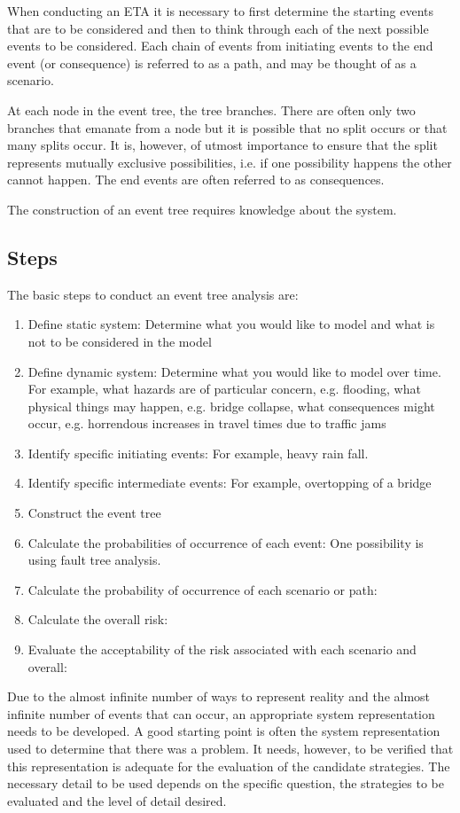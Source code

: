 When conducting an ETA it is necessary to first determine the starting events
that are to be considered and then to think through each of the next possible
events to be considered. Each chain of events from initiating events to the end
event (or consequence) is referred to as a path, and may be thought of as a
scenario.

At each node in the event tree, the tree branches. There are often only two
branches that emanate from a node but it is possible that no split occurs or that
many splits occur. It is, however, of utmost importance to ensure that the split
represents mutually exclusive possibilities, i.e. if one possibility happens the
other cannot happen. The end events are often referred to as consequences.

The construction of an event tree requires knowledge about the system.
\subsection{Steps}


The basic steps to conduct an event tree analysis are:
\begin{enumerate}
\item Define static system: Determine what you would like to model and what is not to
be considered in the model
\item Define dynamic system: Determine what you would like to model over time. For
example, what hazards are of particular concern, e.g. flooding, what physical
things may happen, e.g. bridge collapse, what consequences might occur, e.g.
horrendous increases in travel times due to traffic jams
\item Identify specific initiating events: For example, heavy rain fall.
\item Identify specific intermediate events: For example, overtopping of a bridge
\item Construct the event tree
\item Calculate the probabilities of occurrence of each event: One possibility is
using fault tree analysis.
\item Calculate the probability of occurrence of each scenario or path:
\item Calculate the overall risk:
\item Evaluate the acceptability of the risk associated with each scenario and
overall:
\end{enumerate}
%
Due to the almost infinite number of ways to represent reality and the almost
infinite number of events that can occur, an appropriate system representation
needs to be developed. A good starting point is often the system representation
used to determine that there was a problem. It needs, however, to be verified
that this representation is adequate for the evaluation of the candidate
strategies. The necessary detail to be used depends on the specific question, the
strategies to be evaluated and the level of detail desired.
